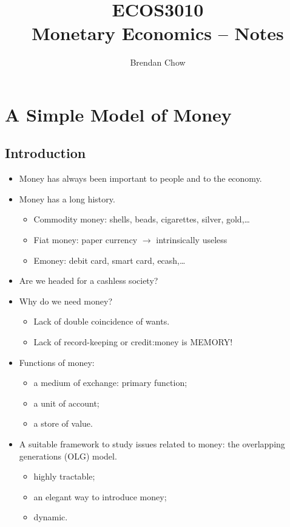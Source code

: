 \documentclass[a4paper]{article}
\begin{document}
\title{{ECOS3010}\\{\normalsize{Monetary Economics -- Notes}}}
	\author{Brendan Chow}
	\maketitle
	\newpage
	\pagestyle{fancynotes}
\section{A Simple Model of Money}
\subsection{Introduction}
	\begin{itemize}
		\item Money has always been important to people and to the economy.
		\item Money has a long history.
		\begin{itemize}
			\item Commodity money: shells, beads, cigarettes, silver, gold,\ldots
		\item Fiat money: paper currency \( \rightarrow \) intrinsically useless
		\item Emoney: debit card, smart card, ecash,\ldots
		\end{itemize}
		\item  Are we headed for a cashless society?
		\item Why do we need money?
		\begin{itemize}
			\item Lack of double coincidence of wants.
			\item Lack of record-keeping or credit:\@ money is MEMORY!
		\end{itemize}
		\item Functions of money:
		\begin{itemize}
			\item a medium of exchange: primary function;
			\item a unit of account;
			\item a store of value.
		\end{itemize}
		\item A suitable framework to study issues related to money: the overlapping generations (OLG) model.
		\begin{itemize}
			\item highly tractable;
			\item an elegant way to introduce money;
			\item dynamic.
		\end{itemize}
	\end{itemize}
\end{document}
